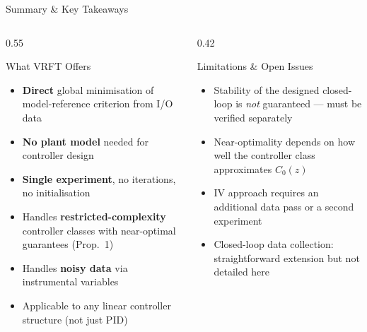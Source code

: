 \documentclass[aspectratio=169]{beamer}
\begin{document}
\begin{frame}{Summary \& Key Takeaways}
  \begin{columns}[T]
    \begin{column}{0.55\textwidth}
      \begin{exampleblock}{What VRFT Offers}
        \begin{itemize}
          \setlength{\itemsep}{0.4em}
          \item \textbf{Direct} global minimisation of model-reference criterion from I/O data
          \item \textbf{No plant model} needed for controller design
          \item \textbf{Single experiment}, no iterations, no initialisation
          \item Handles \textbf{restricted-complexity} controller classes with near-optimal guarantees (Prop.~1)
          \item Handles \textbf{noisy data} via instrumental variables
          \item Applicable to any linear controller structure (not just PID)
        \end{itemize}
      \end{exampleblock}
    \end{column}
    \begin{column}{0.42\textwidth}
      \begin{alertblock}{Limitations \& Open Issues}
        \begin{itemize}
          \item Stability of the designed closed-loop is \emph{not} guaranteed --- must be verified separately
          \item Near-optimality depends on how well the controller class approximates $C_0(z)$
          \item IV approach requires an additional data pass or a second experiment
          \item Closed-loop data collection: straightforward extension but not detailed here
        \end{itemize}
      \end{alertblock}
    \end{column}
  \end{columns}
\end{frame}
\end{document}
